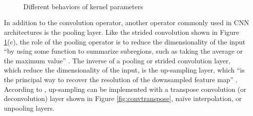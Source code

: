 \documentclass[report.tex]{subfiles}
\begin{document}
\begin{figure}[ht]
	\centering
	\\
	\\
	\\
	\caption{Different behaviors of kernel parameters \parencite[14, 29]{convguide}}
	\label{fig:convdiags}
\end{figure}

In addition to the convolution operator, another operator commonly used in CNN architectures is the pooling layer. Like the strided convolution shown in Figure \ref{fig:convdiags}(c), the role of the pooling operator is to reduce the dimensionality of the input ``by using some function to summarize subregions, such as taking the average or the maximum value'' \parencite[10]{convguide}. The inverse of a pooling or strided convolution layer, which reduce the dimensionality of the input, is the up-sampling layer, which ``is the principal way to recover the resolution of the downsampled feature map'' \parencite[2]{hao2020indexnet}. According to \textcite{hao2020indexnet}, up-sampling can be implemented with a transpose convolution (or deconvolution) layer shown in Figure \ref{fig:convtranspose}, na\"ive interpolation, or unpooling layers.
\end{document}
